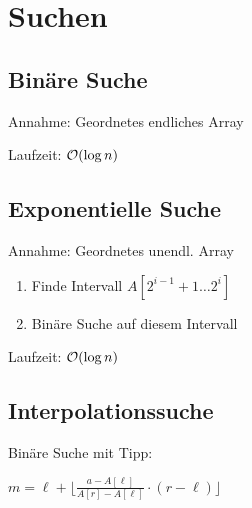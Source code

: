 \section*{Suchen}

\subsection*{Binäre Suche}
Annahme: Geordnetes endliches Array

Laufzeit: $\mathcal{O}(\log n)$

\subsection*{Exponentielle Suche}
Annahme: Geordnetes unendl. Array
\begin{enumerate}
	\item Finde Intervall $A[2^{i-1}+1 \ldots 2^i]$
	\item Binäre Suche auf diesem Intervall
\end{enumerate}
Laufzeit: $\mathcal{O}(\log n)$

\subsection*{Interpolationssuche}
Binäre Suche mit Tipp:

$m = \ell + \lfloor \frac{a-A[\ell]}{A[r]-A[\ell]}\cdot(r-\ell)\rfloor$
